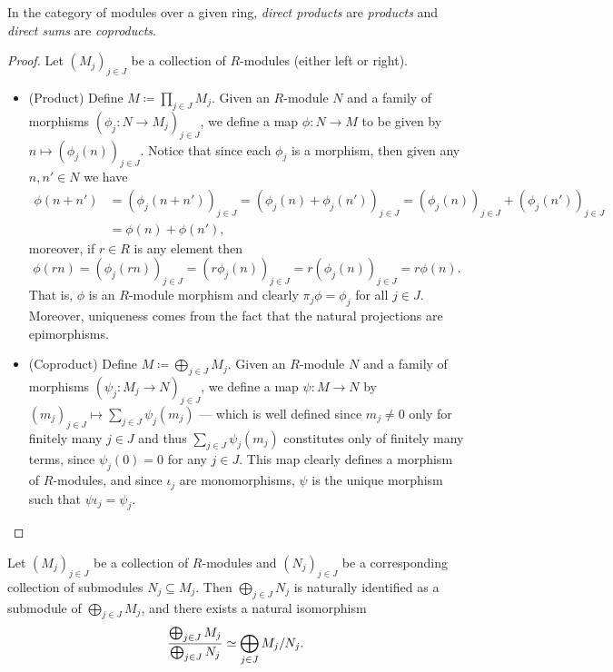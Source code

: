 \begin{theorem}
\label{thm:direct-sum-product-and-coproduct}
In the category of modules over a given ring, \emph{direct products} are
\emph{products} and \emph{direct sums} are \emph{coproducts}.
\end{theorem}

\begin{proof}
Let \((M_j)_{j \in J}\) be a collection of \(R\)-modules (either left or
right).
\begin{itemize}\setlength\itemsep{0em}
\item (Product) Define \(M \coloneq \prod_{j \in J} M_j\). Given an \(R\)-module
  \(N\) and a family of morphisms \((\phi_j: N \to M_j)_{j \in J}\), we define a
  map \(\phi: N \to M\) to be given by \(n \mapsto (\phi_j(n))_{j \in
    J}\). Notice that since each \(\phi_j\) is a morphism, then given any
  \(n, n' \in N\) we have
  \begin{align*}
    \phi(n + n')
    &= (\phi_j(n + n'))_{j \in J}
      = (\phi_j(n) + \phi_j(n'))_{j \in J}
      = (\phi_j(n))_{j \in J} + (\phi_j(n'))_{j \in J} \\
    &= \phi(n) + \phi(n'),
  \end{align*}
  moreover, if \(r \in R\) is any element then
  \[
    \phi(r n)
      = (\phi_j(r n))_{j \in J}
      = (r \phi_j(n))_{j \in J}
      = r (\phi_j(n))_{j \in J}
      = r \phi(n).
  \]
  That is, \(\phi\) is an \(R\)-module morphism and clearly \(\pi_j \phi =
  \phi_j\) for all \(j \in J\). Moreover, uniqueness comes from the fact that
  the natural projections are epimorphisms.

\item (Coproduct) Define \(M \coloneq \bigoplus_{j \in J} M_j\). Given an
  \(R\)-module \(N\) and a family of morphisms
  \((\psi_j: M_j \to N)_{j \in J}\), we define a map \(\psi: M \to N\) by
  \((m_j)_{j \in J} \mapsto \sum_{j \in J} \psi_j(m_j)\) --- which is well
  defined since \(m_j \neq 0\) only for finitely many \(j \in J\) and thus
  \(\sum_{j \in J} \psi_j(m_j)\) constitutes only of finitely many terms, since
  \(\psi_j(0) = 0\) for any \(j \in J\). This map clearly defines a morphism of
  \(R\)-modules, and since \(\iota_j\) are monomorphisms, \(\psi\) is the unique
  morphism such that \(\psi \iota_j = \psi_{j}\).
\end{itemize}
\end{proof}

\begin{proposition}
\label{prop:quotient-family-modules}
Let \((M_j)_{j \in J}\) be a collection of \(R\)-modules and \((N_j)_{j \in J}\)
be a corresponding collection of submodules \(N_j \subseteq M_j\). Then
\(\bigoplus_{j \in J} N_j\) is naturally identified as a submodule of
\(\bigoplus_{j \in J} M_j\), and there exists a natural isomorphism
\[
\frac{\bigoplus_{j \in J} M_j}{\bigoplus_{j \in J} N_j}
\simeq
\bigoplus_{j \in J} M_j/N_j.
\]
\end{proposition}


